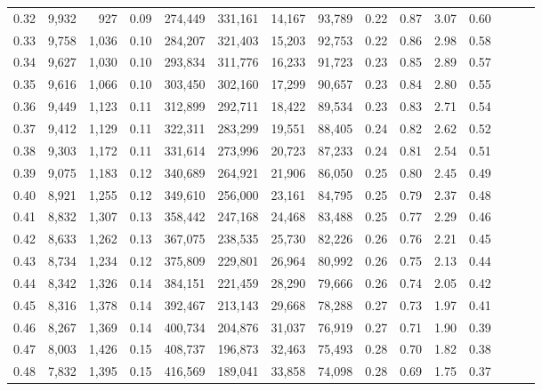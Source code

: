\begin{tabular}{rrrrrrrrrrrrrrr}
0.32 &   9,932 &    927 &  0.09 &  274,449 &  331,161 &   14,167 &   93,789 &  0.22 &  0.87 &  3.07 &      0.60 \\
0.33 &   9,758 &  1,036 &  0.10 &  284,207 &  321,403 &   15,203 &   92,753 &  0.22 &  0.86 &  2.98 &      0.58 \\
0.34 &   9,627 &  1,030 &  0.10 &  293,834 &  311,776 &   16,233 &   91,723 &  0.23 &  0.85 &  2.89 &      0.57 \\
0.35 &   9,616 &  1,066 &  0.10 &  303,450 &  302,160 &   17,299 &   90,657 &  0.23 &  0.84 &  2.80 &      0.55 \\
0.36 &   9,449 &  1,123 &  0.11 &  312,899 &  292,711 &   18,422 &   89,534 &  0.23 &  0.83 &  2.71 &      0.54 \\
0.37 &   9,412 &  1,129 &  0.11 &  322,311 &  283,299 &   19,551 &   88,405 &  0.24 &  0.82 &  2.62 &      0.52 \\
0.38 &   9,303 &  1,172 &  0.11 &  331,614 &  273,996 &   20,723 &   87,233 &  0.24 &  0.81 &  2.54 &      0.51 \\
0.39 &   9,075 &  1,183 &  0.12 &  340,689 &  264,921 &   21,906 &   86,050 &  0.25 &  0.80 &  2.45 &      0.49 \\
0.40 &   8,921 &  1,255 &  0.12 &  349,610 &  256,000 &   23,161 &   84,795 &  0.25 &  0.79 &  2.37 &      0.48 \\
0.41 &   8,832 &  1,307 &  0.13 &  358,442 &  247,168 &   24,468 &   83,488 &  0.25 &  0.77 &  2.29 &      0.46 \\
0.42 &   8,633 &  1,262 &  0.13 &  367,075 &  238,535 &   25,730 &   82,226 &  0.26 &  0.76 &  2.21 &      0.45 \\
0.43 &   8,734 &  1,234 &  0.12 &  375,809 &  229,801 &   26,964 &   80,992 &  0.26 &  0.75 &  2.13 &      0.44 \\
0.44 &   8,342 &  1,326 &  0.14 &  384,151 &  221,459 &   28,290 &   79,666 &  0.26 &  0.74 &  2.05 &      0.42 \\
0.45 &   8,316 &  1,378 &  0.14 &  392,467 &  213,143 &   29,668 &   78,288 &  0.27 &  0.73 &  1.97 &      0.41 \\
0.46 &   8,267 &  1,369 &  0.14 &  400,734 &  204,876 &   31,037 &   76,919 &  0.27 &  0.71 &  1.90 &      0.39 \\
0.47 &   8,003 &  1,426 &  0.15 &  408,737 &  196,873 &   32,463 &   75,493 &  0.28 &  0.70 &  1.82 &      0.38 \\
0.48 &   7,832 &  1,395 &  0.15 &  416,569 &  189,041 &   33,858 &   74,098 &  0.28 &  0.69 &  1.75 &      0.37 \\

\end{tabular}
